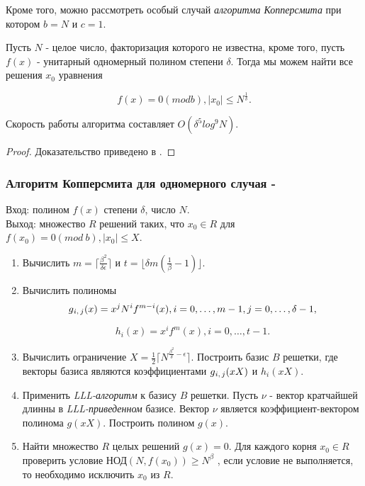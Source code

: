     Кроме того, можно рассмотреть особый случай \textit{алгоритма Копперсмита} при котором $b=N$ и $c=1$.

  \begin{theorem}
    Пусть {$N$} - целое число, факторизация которого не известна, кроме того, пусть {$f(x)$} - унитарный одномерный полином степени {$\delta$}. Тогда 
    мы можем найти все решения {$x_0$} уравнения

      \begin{equation}
        f(x) = 0 (mod b), |x_0| \le N^{\frac{1}{\delta}}.
      \end{equation}

    Скорость работы алгоритма составляет {$O(\delta^5 log^9 N)$}.
    \begin{proof}
      Доказательство приведено в \cite[страницы 326-327]{may10}.
    \end{proof}
  \end{theorem}

  \subsubsection{Алгоритм Копперсмита для одномерного случая - \cite[страницы 321-327]{may10}}
    Вход: полином {$f(x)$} степени {$\delta$}, число {$N$}. \\
    Выход: множество {$R$} решений таких, что {$x_0 \in R$} для {$f(x_0) = 0 (mod \: b), |x_0| \le X$}.
    
    \begin{enumerate}
      \item Вычислить {$m = \lceil \frac{\beta^2}{\delta \epsilon} \rceil$} и {$t = \lfloor \delta m (\frac{1}{\beta} - 1) \rfloor$}.
      \item Вычислить полиномы
	\begin{equation}
	   g\textsubscript{{$i,j$}}(x) = x^j N^i f^{m-i}(x), i=0, \dots, m-1, j=0, \dots, \delta-1,
	\end{equation}
	
	\begin{equation}
	   h_i(x) = x^i f^m(x), i = 0, \dots, t-1.
	\end{equation}
	
      \item Вычислить ограничение {$X = \frac{1}{2} \lceil N^{\frac{\beta^2}{\delta} - \epsilon} \rceil$}. Построить базис {$B$} решетки,
	где векторы базиса являются коэффициентами {$g\textsubscript{{$i,j$}}(x X)$} и {$h_i(x X)$}.
      \item Применить \textit{LLL-алгоритм} к базису {$B$} решетки. Пусть {$\nu$} - вектор кратчайшей длинны в \textit{LLL-приведенном} базисе. Вектор {$\nu$}
	является коэффициент-вектором полинома {$g(xX)$}. Построить полином {$g(x)$}.
      \item Найти множество {$R$} целых решений {$g(x) = 0$}. Для каждого корня {$x_0 \in R$} проверить условие НОД{$(N, f(x_0)) \ge N^\beta$}
      , если условие не выполняется, то необходимо исключить {$x_0$} из {$R$}.
    \end{enumerate}    